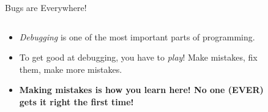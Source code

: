 \documentclass[10pt]{beamer}
\begin{document}
\begin{frame}{Bugs are Everywhere!}
	
	\begin{columns}	
		\begin{column}{0.5\textwidth}
			\begin{itemize}[<+->]
				\item \textit{Debugging} is one of the most important parts of programming.
				\item To get good at debugging, you have to \textit{play}! Make mistakes, fix them, make more mistakes.
				\item \textbf{Making mistakes is how you learn here! No one (EVER) gets it right the first time!}				
			\end{itemize}
		\end{column}
		\begin{column}{0.5\textwidth}
			\begin{figure}[h]		
				\centering
				\caption*{}
			\end{figure}
		\end{column}
	\end{columns}
	
\end{frame}
\end{document}
